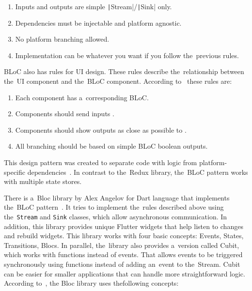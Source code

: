 \begin{enumerate}
    \item Inputs and outputs are simple
    \texttt|Stream|/\texttt|Sink| only.
    \item Dependencies must be injectable and platform agnostic.
    \item No platform branching allowed.
    \item Implementation can be whatever you want
    if you follow the~previous rules.
\end{enumerate}

BLoC also has rules for UI design.
These rules describe the~relationship between the~UI component and the~BLoC component.
According to~\cite{paolosoares_2018_flutter} these rules are:

\begin{enumerate}
    \item Each  component has a~corresponding BLoC.
    \item Components should send inputs .
    \item Components should show outputs as close as possible to .
    \item All branching should be based on simple BLoC boolean outputs.
\end{enumerate}

This design pattern was created to separate code with logic
from platform-specific dependencies~\cite{paolosoares_2018_flutter}.
In contrast to the~Redux library, the~BLoC pattern works with multiple state stores.

There is a~Bloc library by Alex Angelov for Dart language that implements the~BLoC pattern~\cite{angelov_2022_bloc}.
It tries to implement the~rules described above using the~\texttt{Stream} and \texttt{Sink} classes, which allow asynchronous communication.
In addition, this library provides unique Flutter widgets that help listen to changes and rebuild widgets.
This library works with four basic concepts: Events, States, Transitions, Blocs.
In parallel, the~library also provides a~version called Cubit, which works with functions instead of events.
That allows events to be triggered synchronously using functions instead of adding an~event to the~Stream.
Cubit can be easier for smaller applications that can handle more straightforward logic.
According to~\cite{angelov_2022_bloc}, the Bloc library uses the\linebreak{}following concepts:

